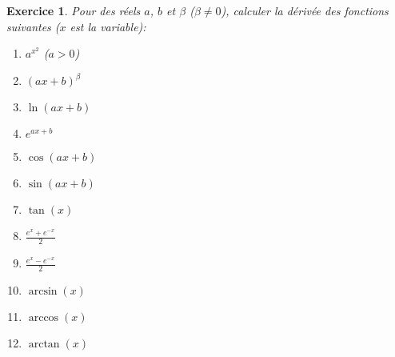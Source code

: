 \documentclass[12pt]{article}
\newtheorem{exercice}{\bf Exercice}
\newtheorem{correction}{\bf Correction exercice}
\newenvironment{exo}{
\begin{exercice}\smallskip\normalfont}{\end{exercice}
}
\newenvironment{cor}{
\begin{correction}\smallskip\normalfont}{\end{correction}
}
\newif\ifcorrige\corrigefalse
\begin{document}
\ifcorrige
\color{magenta}
\begin{cor}
  \begin{center}
  \begin{tikzpicture}[scale=2]
    \draw[->] (-1,0) -- (3,0) node[right] {$x$};
    \draw[->] (0,-2) -- (0,3) node[above] {$y$};
    \draw[domain=0.05:3,variable=\x, green] plot ({\x},{ln(\x)+1}) node[above] {$y=\ln(x)+1$};
    \draw[domain=2.05:5,variable=\x, blue] plot ({\x},{ln(\x-2)}) node[above] {$y=\ln(x-2)$};
    \draw[domain=-3:-0.05,variable=\x, red] plot ({\x},{ln(-\x)}) node[left] {$y=\ln(-x)$};
    \draw[domain=-1.95:1,variable=\x, violet] plot ({\x},{ln(\x+2)}) node[above] {$y=\ln(x+2)$};
    \draw[domain=-2:0.95,variable=\x, orange] plot ({\x},{ln(1-\x)}) node[right] {$y=\ln(1-x)$};
    \draw[domain=0.05:3,variable=\x, black, dotted] plot ({\x},{ln(\x)}) node[right] {$y=\ln(x)$};
  \end{tikzpicture}
\end{center}
\end{cor}
\color{black}
\fi



\begin{exo} Pour des r\'eels $a$, $b$ et $\beta$ ($\beta \neq 0$), calculer la d\'eriv\'ee des fonctions suivantes ($x$ est la variable):
\begin{multicols}{4}
\begin{enumerate}
\item $a^{x^2}$ ($a>0$)
\item $(ax+b)^{\beta}$
\item $\ln(ax+b)$
\item $e^{ax+b}$
\item $\cos(ax+b)$
\item $\sin(ax+b)$
\item $\tan(x)$
\item $\frac{e^x + e^{-x}}{2}$
\item $\frac{e^x - e^{-x}}{2}$
\item $\arcsin(x)$
\item $\arccos(x)$
\item $\arctan(x)$
\end{enumerate}
\end{multicols}
\end{exo}
\end{document}
